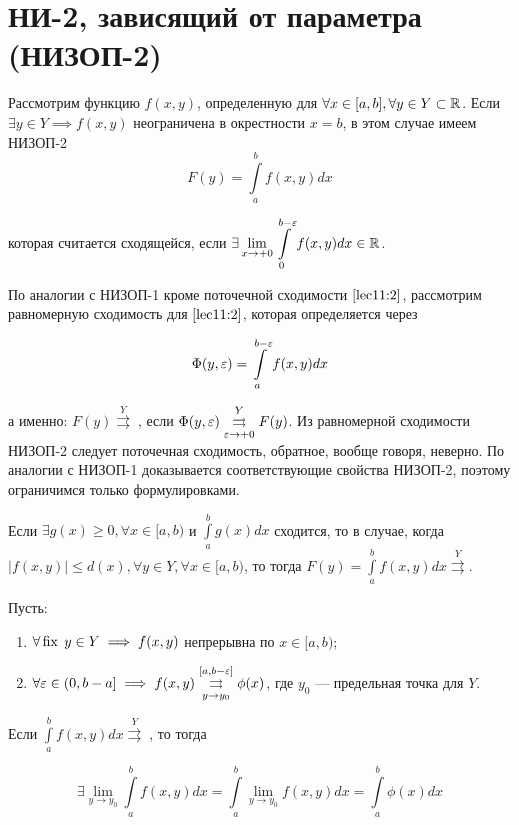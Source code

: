 \documentclass[../../main.tex]{subfiles}
\begin{document}
\section{НИ-2, зависящий от параметра (НИЗОП-2)}

	Рассмотрим функцию $f(x, y)$, определенную для $\forall x \in [a, b], \forall 
	y \in Y \subset \mathbb{R}$. Если $\exists y \in Y \implies f(x, y)$ неограничена в 
	окрестности $x = b$, в этом случае имеем НИЗОП-2 
	\begin{equation}\label{lec11:3}
		F(y) = \int\limits_a^b f(x, y) dx
	\end{equation}
	
	которая считается сходящейся, если $\displaystyle \exists \lim_{x \rightarrow 
	+0} \int\limits_0^{b - \varepsilon} f(x, y) dx \in \mathbb{R}$.
	
	По аналогии с НИЗОП-1 кроме поточечной сходимости $\eqref{lec11:2}$, 
	рассмотрим равномерную сходимость для $\eqref{lec11:2}$, которая определяется 
	через 
	
	\begin{equation}\label{lec11:4}
		\Phi(y, \varepsilon) = \int\limits_a^{b - \varepsilon} f(x, y) dx
	\end{equation}
	
	а именно: $F(y) \overset{Y}\rightrightarrows\;$, если $\Phi(y, \varepsilon) 
	\overset{Y}{\underset{\varepsilon \rightarrow +0}\rightrightarrows} F(y)$. Из 
	равномерной сходимости НИЗОП-2 следует поточечная сходимость, обратное, 
	вообще говоря, неверно. По аналогии с НИЗОП-1 доказывается соответствующие 
	свойства НИЗОП-2, поэтому ограничимся только формулировками.
	
	\begin{thm}
		Если $\exists g(x) \geq 0, \forall x \in [a, b)$ и $\int\limits_a^b g(x) dx$ 
		сходится, то в случае, когда $|f(x, y)| \leq d(x), \forall y \in Y, \forall 
		x \in [a, b)$, то тогда $F(y) = \int\limits_a^b f(x, y) dx 
		\overset{Y}{\rightrightarrows}$.
	\end{thm}
	
	\begin{thm}
		Пусть:
		
		\begin{enumerate}
			\item $\forall \operatorname{fix} \; y \in Y \implies f(x, y)$ непрерывна по $x \in [a, 
			b)$;
			\item $\forall \varepsilon \in (0, b - a] \implies f(x, y) \overset{[a, b - 
			\varepsilon]}{\underset{y \rightarrow y_0}\rightrightarrows} \phi(x)$, где $y_0$ 
			--- предельная точка для $Y$.
		\end{enumerate}
		
		Если $\int\limits_a^b f(x, y) dx \overset{Y}\rightrightarrows \;$, то тогда 
		
		\begin{equation}\label{lec11:5}
			\exists \lim_{y \rightarrow y_0} \int\limits_a^b f(x, y) dx = 
			\int\limits_a^b \lim_{y \rightarrow y_0} f(x, y) dx = \int\limits_a^b 
			\phi(x) dx
		\end{equation}
	\end{thm}
\end{document}
